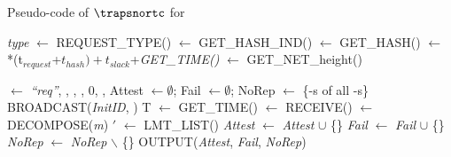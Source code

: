  
 \begin{algorithm}[hbt!]
\footnotesize
 \caption{Pseudo-code of $\boldsymbol{\trapsnortc}$ for \vrf}\label{alg:nortc_vrf}
     \begin{algorithmic}[1]
         \State \textit{type} $\gets$ REQUEST\_TYPE() 
         \State \hashind $\gets$ GET\_HASH\_IND()
         \State \hash $\gets$ GET\_HASH(\hashind)
         \State \attesttime $\gets$ \textit{\netheight}*(t$_{request}$+$t_{hash})+t_{slack}$+\textit{GET\_TIME()}
         \State \netheight $\gets$ GET\_NET\_height()
    
         \State \Attreq $\gets$ \textit{``req''}, \vrf, \hashind, \hash, 0, \netheight, \attesttime
         \State Attest $\gets \emptyset$; Fail $\gets \emptyset$; NoRep $\gets$ \{\devid-s of all \prv-s\}
         \State BROADCAST(\textit{InitID}, \Attreq)
         \State T $\gets$ GET\_TIME()
             \State \Attrep $\gets$ RECEIVE()
             \State [\devid, \parent, \attesttime, \hash, \{\lmt\}, \Authrep] $\gets$ DECOMPOSE(\textit{\textit{m}})
             \State \lmt$'$ $\gets$ LMT\_LIST(\devid) 
                     \State \textit{Attest} $\gets$ \textit{Attest} $\cup$ \{\devid\}
                 \Else
                     \State \textit{Fail} $\gets$ \textit{Fail} $\cup$ \{\devid\}
                 \EndIf
             \State \textit{NoRep} $\gets$ \textit{NoRep} $\backslash$ \{\devid\}
             \EndIf
        \EndWhile
        \State OUTPUT(\textit{Attest}, \textit{Fail}, \textit{NoRep})
     \EndWhile
     \end{algorithmic}
 \end{algorithm} 

\newpage

